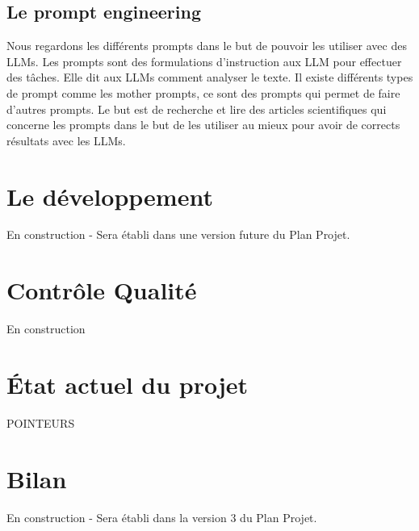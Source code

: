 \documentclass[11pt]{rapport_class}
\begin{document}
\section{Le prompt engineering}
Nous regardons les différents prompts dans le but de pouvoir les utiliser avec des LLMs. Les prompts sont des formulations d'instruction aux LLM pour effectuer des tâches. Elle dit aux LLMs comment analyser le texte. Il existe différents types de prompt comme les mother prompts, ce sont des prompts qui permet de faire d’autres prompts. Le but est de recherche et lire des articles scientifiques qui concerne les prompts dans le but de les utiliser au mieux pour avoir de corrects résultats avec les LLMs.





\chapter{Le développement}
\centerline{En construction - Sera établi dans une version future du Plan Projet.}

\chapter{Contrôle Qualité}
\centerline{En construction}


\chapter{État actuel du projet}
POINTEURS

\chapter{Bilan}
\centerline{En construction - Sera établi dans la version 3 du Plan Projet.}
\end{document}
